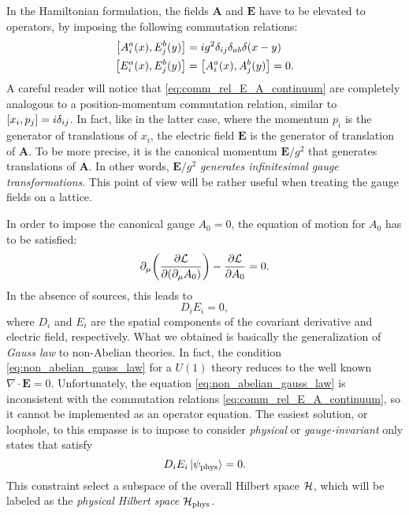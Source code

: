 In the Hamiltonian formulation, the fields $\mathbf{A}$ and $\mathbf{E}$ have to be elevated to operators, by imposing the following commutation relations:
\begin{equation}
    \begin{split}
        \comm{A^a_i(x)}{E^b_j(y)} & = i g^2 \delta_{ij} \delta_{ab} \delta(x-y) \\
        \comm{E^a_i(x)}{E^b_j(y)} & = \comm{A^a_i(x)}{A^b_j(y)} = 0.
    \end{split}
    \label{eq:comm_rel_E_A_continuum}
\end{equation}
A careful reader will notice that \eqref{eq:comm_rel_E_A_continuum} are completely analogous to a position-momentum commutation relation, similar to $\comm{x_i}{p_j} = i \delta_{ij}$.
In fact, like in the latter case, where the momentum $p_i$ is the generator of translations of $x_i$, the electric field $\mathbf{E}$ is the generator of translation of $\mathbf{A}$.
To be more precise, it is the canonical momentum $\mathbf{E}/g^2$ that generates translations of $\mathbf{A}$.
In other words, $\mathbf{E}/g^2$ \emph{generates infinitesimal gauge transformations}.
This point of view will be rather useful when treating the gauge fields on a lattice.


In order to impose the canonical gauge $A_0 = 0$, the equation of motion for $A_0$ has to be satisfied:
\begin{equation}
    \partial_{\mu} \qty( \pdv{\mathcal{L}}{(\partial_{\mu} A_0)} ) - \pdv{\mathcal{L}}{A_0} = 0.
\end{equation}
In the absence of sources, this leads to
\begin{equation}
    D_i E_i = 0,
    \label{eq:non_abelian_gauss_law}
\end{equation}
where $D_i$ and $E_i$ are the spatial components of the covariant derivative and electric field, respectively.
What we obtained is basically the generalization of \emph{Gauss law} to non-Abelian theories.
In fact, the condition \eqref{eq:non_abelian_gauss_law} for a $U(1)$ theory reduces to the well known $\nabla \cdot \mathbf{E} = 0$.
Unfortunately, the equation \eqref{eq:non_abelian_gauss_law} is inconsistent with the commutation relations \eqref{eq:comm_rel_E_A_continuum}, so it cannot be implemented as an operator equation.
The easiest solution, or loophole, to this empasse is to impose to consider \emph{physical} or \emph{gauge-invariant} only states that satisfy
\begin{equation}
    D_i E_i \ket{\psi_{\text{phys}}} = 0.
\end{equation}
This constraint select a subspace of the overall Hilbert space $\mathcal{H}$, which will be labeled as the \emph{physical Hilbert space} $\mathcal{H}_{\text{phys}}$.


